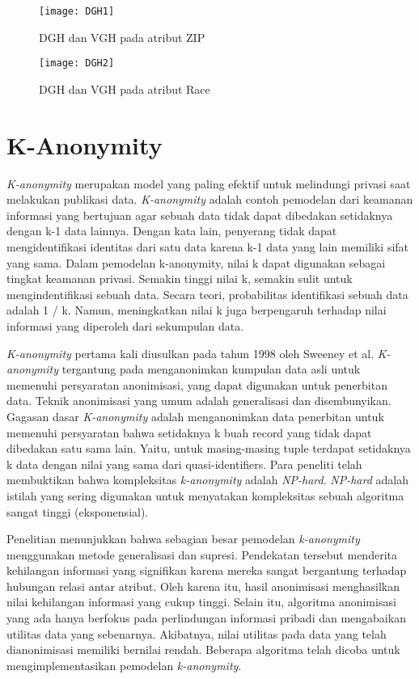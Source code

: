 \begin{figure}[H]
	\centering
	\texttt{[image: DGH1]}
	\caption{DGH dan VGH pada atribut ZIP}
	\label{fig:DGH1}
\end{figure}

\begin{figure}[H]
	\centering
	\texttt{[image: DGH2]}
	\caption{DGH dan VGH pada atribut Race}
	\label{fig:DGH2}
\end{figure}

\newpage
\section{K-Anonymity}
\textit{K-anonymity} merupakan model yang paling efektif untuk melindungi privasi saat melakukan publikasi data. \textit{K-anonymity} adalah contoh pemodelan dari keamanan informasi yang bertujuan agar sebuah data tidak dapat dibedakan setidaknya dengan k-1 data lainnya. Dengan kata lain, penyerang tidak dapat mengidentifikasi identitas dari satu data karena k-1 data yang lain memiliki sifat yang sama. Dalam pemodelan k-anonymity, nilai k dapat digunakan sebagai tingkat keamanan privasi. Semakin tinggi nilai k, semakin sulit untuk mengindentifikasi sebuah data. Secara teori, probabilitas identifikasi sebuah data adalah 1 / k. Namun, meningkatkan nilai k juga berpengaruh terhadap nilai informasi yang diperoleh dari sekumpulan data.

\par \textit{K-anonymity} pertama kali diusulkan pada tahun 1998 oleh Sweeney et al. \textit{K-anonymity} tergantung pada menganonimkan kumpulan data asli untuk memenuhi persyaratan anonimisasi, yang dapat digunakan untuk penerbitan data. Teknik anonimisasi yang umum adalah generalisasi dan disembunyikan. Gagasan dasar \textit{K-anonymity} adalah menganonimkan data penerbitan untuk memenuhi persyaratan bahwa setidaknya k buah record yang tidak dapat dibedakan satu sama lain. Yaitu, untuk masing-masing tuple terdapat setidaknya k data dengan nilai yang sama dari quasi-identifiers. Para peneliti telah membuktikan bahwa kompleksitas \textit{k-anonymity} adalah \textit{NP-hard}. \textit{NP-hard} adalah istilah yang sering digunakan untuk menyatakan kompleksitas sebuah algoritma sangat tinggi (eksponensial).

\par Penelitian menunjukkan bahwa sebagian besar pemodelan \textit{k-anonymity} menggunakan metode generalisasi dan supresi. Pendekatan tersebut menderita kehilangan informasi yang signifikan karena mereka sangat bergantung terhadap hubungan relasi antar atribut. Oleh karena itu, hasil anonimisasi menghasilkan nilai kehilangan informasi yang cukup tinggi. Selain itu, algoritma anonimisasi yang ada hanya berfokus pada perlindungan informasi pribadi dan mengabaikan utilitas data yang sebenarnya. Akibatnya, nilai utilitas pada data yang telah dianonimisasi memiliki bernilai rendah. Beberapa algoritma telah dicoba untuk mengimplementasikan pemodelan \textit{k-anonymity}.

